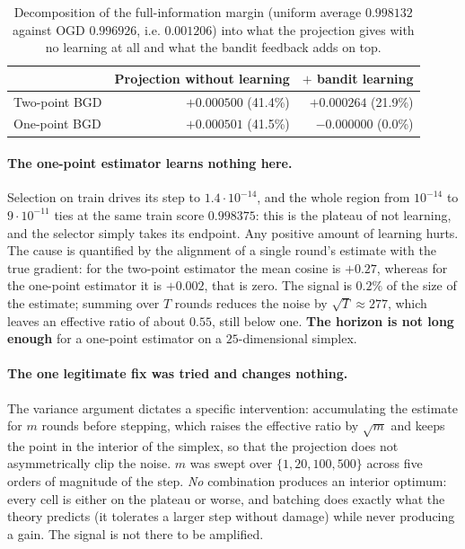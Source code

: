 \documentclass[12pt,a4paper,oneside]{report}
\renewcommand{\_}{\oldunderscore\allowbreak}
\theoremstyle{definition}
\theoremstyle{plain}
\theoremstyle{remark}
\begin{document}
\begin{table}[H]
\centering
\small
\begin{tabular}{lrr}
\toprule
& \textbf{Projection without learning} & \textbf{$+$ bandit learning} \\
\midrule
Two-point BGD & $+0.000500$ \;(41.4\%) & $+0.000264$ \;(21.9\%) \\
One-point BGD & $+0.000501$ \;(41.5\%) & $\mathbf{-0.000000}$ \;(0.0\%) \\
\bottomrule
\end{tabular}
\caption{Decomposition of the full-information margin (uniform average $0.998132$ against OGD
$0.996926$, i.e. $0.001206$) into what the projection gives with no learning at all and what the
bandit feedback adds on top.}
\label{tab:bandit-decomp}
\end{table}

\paragraph{The one-point estimator learns nothing here.} Selection on train drives its step to
$1.4\cdot10^{-14}$, and the whole region from $10^{-14}$ to $9\cdot10^{-11}$ ties at the same
train score $0.998375$: this is the plateau of not learning, and the selector simply takes its
endpoint. Any positive amount of learning hurts. The cause is quantified by the alignment of a
single round's estimate with the true gradient: for the two-point estimator the mean cosine is
$+0.27$, whereas for the one-point estimator it is $+0.002$, that is zero. The signal is $0.2\%$
of the size of the estimate; summing over $T$ rounds reduces the noise by $\sqrt{T}\approx277$,
which leaves an effective ratio of about $0.55$, still below one. \textbf{The horizon is not
long enough} for a one-point estimator on a $25$-dimensional simplex.

\paragraph{The one legitimate fix was tried and changes nothing.} The variance argument dictates a
specific intervention: accumulating the estimate for $m$ rounds before stepping, which raises the
effective ratio by $\sqrt{m}$ and keeps the point in the interior of the simplex, so that the
projection does not asymmetrically clip the noise. $m$ was swept over $\{1,20,100,500\}$ across
five orders of magnitude of the step. \emph{No} combination produces an interior optimum: every
cell is either on the plateau or worse, and batching does exactly what the theory predicts (it
tolerates a larger step without damage) while never producing a gain. The signal is not there
to be amplified.
\end{document}

